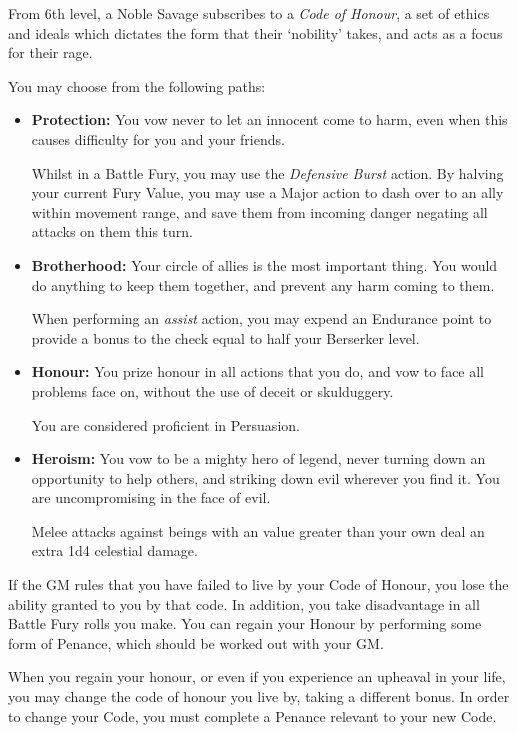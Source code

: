 {
	From 6th level, a Noble Savage subscribes to a {\it Code of Honour}, a set of ethics and ideals which dictates the form that their `nobility' takes, and acts as a focus for their rage. 
	
	You may choose from the following paths:
	
	\newcommand\code[3]
	{
		\item {\bf #1:} #2
		
		#3
		
		
	}
	
	\begin{itemize}
		\code{Protection}{You vow never to let an innocent come to harm, even when this causes difficulty for you and your friends.}{Whilst in a Battle Fury, you may use the {\it Defensive Burst} action. By halving your current Fury Value, you may use a Major action to dash over to an ally within movement range, and save them from incoming danger \minus{} negating all attacks on them this turn. }
		\code{Brotherhood}{Your circle of allies is the most important thing. You would do anything to keep them together, and prevent any harm coming to them.}{When performing an {\it assist} action, you may expend an Endurance point to provide a bonus to the check equal to half your Berserker level.}
		\code{Honour}{You prize honour in all actions that you do, and vow to face all problems face on, without the use of deceit or skulduggery.}{You are considered proficient in Persuasion.}
		\code{Heroism}{You vow to be a mighty hero of legend, never turning down an opportunity to help others, and striking down evil wherever you find it. You are uncompromising in the face of evil.}{Melee attacks against beings with an \attEvl{} value greater than your own deal an extra 1d4 celestial damage.}
	\end{itemize}
	
	If the GM rules that you have failed to live by your Code of Honour, you lose the ability granted to you by that code. In addition, you take disadvantage in all Battle Fury rolls you make. You can regain your Honour by performing some form of Penance, which should be worked out with your GM.  
	
	When you regain your honour, or even if you experience an upheaval in your life, you may change the code of honour you live by, taking a different bonus. In order to change your Code, you must complete a Penance relevant to your new Code.  
}

